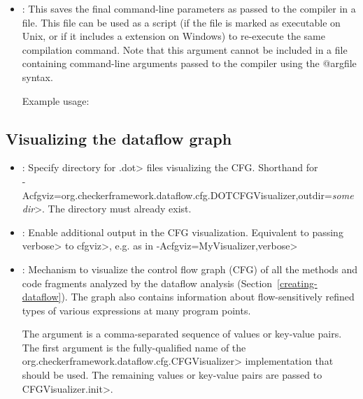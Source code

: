 \begin{itemize}

\item {}:
  This saves the final command-line parameters as passed to the compiler in a file.
  This file can be used as a script (if the file is marked as executable on Unix, or
  if it includes a  extension on Windows) to re-execute the same compilation command.
  Note that this argument cannot be included in a file containing command-line arguments
  passed to the compiler using the @argfile syntax.

  Example usage: 

\end{itemize}

\subsection{Visualizing the dataflow graph\label{creating-debugging-dataflow-graph}}

\begin{itemize}

\item {}:
  Specify directory for \<.dot> files visualizing the CFG\@.
  Shorthand for\\
  \<-Acfgviz=org.checkerframework.dataflow.cfg.DOTCFGVisualizer,outdir=\emph{somedir}>.
  The directory must already exist.

\item {}:
  Enable additional output in the CFG visualization.
  Equivalent to passing \<verbose> to \<cfgviz>, e.g. as in
  \<-Acfgviz=MyVisualizer,verbose>

\item {}:
  Mechanism to visualize the control flow graph (CFG) of
  all the methods and code fragments
  analyzed by the dataflow analysis (Section~\ref{creating-dataflow}).
  The graph also contains information about flow-sensitively refined
  types of various expressions at many program points.

  The argument is a comma-separated sequence of values or key-value pairs.
  The first argument is the fully-qualified name of the
  \<org.checkerframework.dataflow.cfg.CFGVisualizer> implementation
  that should be used. The remaining values or key-value pairs are
  passed to \<CFGVisualizer.init>.

\end{itemize}

